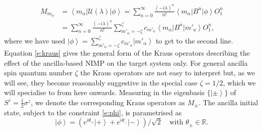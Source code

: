 \documentclass[epjST,numbook]{svjour}
\newcommand\RR{{\mathds{R}}}
\newcommand{\couple}{\mathscr{U}}
\newcommand{\ket}[1]{\left \vert #1 \right >}
\newcommand{\matel}[3]{ \displaystyle \left\langle #1 \right \vert #2 \left\vert  #3 \right\rangle }
\begin{document}
\begin{equation}\label{e:kraus}
	\begin{split}
		M_{m_\alpha} &= \matel{m_\alpha}{\mathscr{U}(\lambda)}{\phi}
		= \sum_{n=0}^\infty \frac{(-i\lambda)^n}{n!} \matel{m_\alpha}{B^n}{\phi}O_1^n \\
		&= \sum_{n=0}^\infty \frac{(-i\lambda)^n}{n!}\sum_{m'_\alpha = -\zeta}^\zeta c_{m'_\alpha} \matel{m_\alpha}{B^n}{m'_a} O_1^n,
	\end{split}
\end{equation}
where we have used $\ket{\phi}=\sum_{m'_\alpha=-\zeta}^\zeta c_{m'_\alpha} \ket{m'_\alpha}$ to get to the second line.
Equation \eqref{e:kraus} gives the general form of the Kraus operators describing the effect of the ancilla-based NIMP on the target system only. For general ancilla spin quantum number $\zeta$ the Kraus operators are not easy to interpret but, as we will see, they become reasonably suggestive in the special case $\zeta=1/2$, which we will specialise to from here onwards. Measuring in the eigenbasis $\{\ket{\pm}\}$ of $S^z=\frac{1}{2}\sigma^z$, we denote the corresponding Kraus operators as $M_\pm$. The ancilla initial state, subject to the constraint \eqref{e:phi}, is parametrised as 
\begin{equation}\label{e:phiKraus}
	\ket{\phi}=(e^{i\theta_+}\ket{+}+e^{i\theta_-}\ket{-})/\sqrt{2} \quad\text{with $\theta_\pm \in \RR$}.
\end{equation}  %
\end{document}
